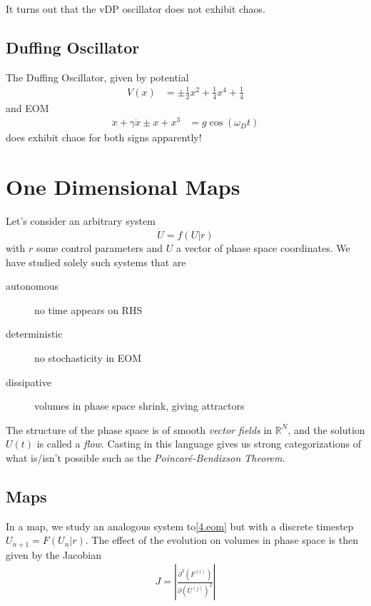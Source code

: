 \documentclass[12pt]{article}
\newcommand{\ptd}[2]{\frac{\partial^2 #1}{\partial#2^2}}
\newcommand{\abs}[1]{\left|#1\right|}
\begin{document}
It turns out that the vDP oscillator does not exhibit chaos.

\subsection{Duffing Oscillator}

The Duffing Oscillator, given by potential
\begin{align}
    V(x) &= \pm \frac{1}{2}x^2 + \frac{1}{4}x^4 + \frac{1}{4}
\end{align}
and EOM
\begin{align}
    \ddot{x} + \gamma \dot{x} \pm x + x^3 &= g\cos(\omega_D t)
\end{align}
does exhibit chaos for both signs apparently!

\clearpage

\section{One Dimensional Maps}

Let's consider an arbitrary system
\begin{equation}
    \dot{U} = f(U|r)\label{4.eom}
\end{equation}
with $r$ some control parameters and $U$ a vector of phase space coordinates. We
have studied solely such systems that are
\begin{description}
    \item[autonomous] no time appears on RHS
    \item[deterministic] no stochasticity in EOM
    \item[dissipative] volumes in phase space shrink, giving attractors
\end{description}

The structure of the phase space is of smooth \emph{vector fields} in
$\mathbb{R}^N$, and the solution $U(t)$ is called a \emph{flow}. Casting in this
language gives us strong categorizations of what is/isn't possible such as the
\emph{Poincar\'e-Bendixson Theorem}.

\subsection{Maps}

In a map, we study an analogous system to\eqref{4.eom} but with a discrete
timestep $U_{n+1} = F(U_n|r)$. The effect of the evolution on volumes in phase
space is then given by the Jacobian
\begin{align}
    J = \abs{\ptd{(F^{(i)})}{(U^{(j)})}}
\end{align}
\end{document}
